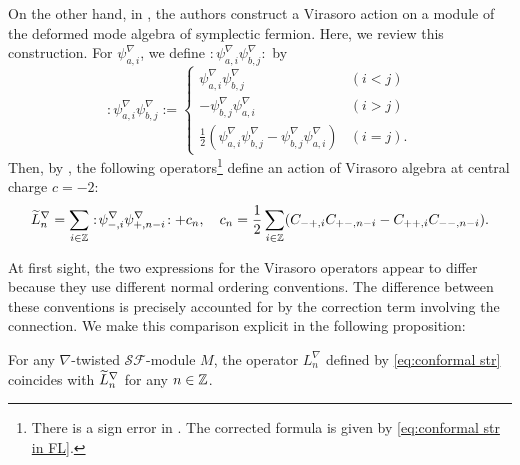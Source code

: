 \documentclass[final,reqno]{amsart}
\begin{document}
On the other hand, in \cite[\S 4]{FL25}, the authors construct a Virasoro action on a module of the deformed mode algebra of symplectic fermion. Here, we review this construction. For $\psi^\nabla_{a,i}$, we define $:\!\psi^\nabla_{a,i}\psi^\nabla_{b,j}\!:$ by
\[  
    :\!\psi^\nabla_{a,i}\psi^\nabla_{b,j}\!:=\left\{
    \begin{array}{cl}
        \psi^\nabla_{a,i}\psi^\nabla_{b,j} & (i<j)\\
        -\psi^\nabla_{b,j}\psi^\nabla_{a,i} & (i>j)\\
        \frac{1}{2}(\psi^\nabla_{a,i}\psi^\nabla_{b,j}-\psi^\nabla_{b,j}\psi^\nabla_{a,i}) & (i=j).
    \end{array}
    \right.
\]
Then, by \cite[Lemma~4.3]{FL25}, the following operators\footnote{There is a sign error in \cite[Lemma~4.3]{FL25}. The corrected formula is given by \cref{eq:conformal str in FL}.} define an action of Virasoro algebra at central charge $c=-2$:
\begin{equation}\label{eq:conformal str in FL}
    \widetilde{L}^\nabla_n=\sum_{i\in\mathbb{Z}}:\!\psi^\nabla_{-,i}\psi^\nabla_{+,n-i}\!:+c_n,\quad c_n=\frac{1}{2}\sum_{i\in\mathbb{Z}}(C_{-+,i}C_{+-,n-i}-C_{++,i}C_{--,n-i}).
\end{equation}

At first sight, the two expressions for the Virasoro operators appear to differ because they use different normal ordering conventions. The difference between these conventions is precisely accounted for by the correction term involving the connection. We make this comparison explicit in the following proposition:
\begin{prp}
    For any $\nabla$-twisted $\mathcal{SF}$-module $M$, the operator $L^\nabla_n$ defined by \cref{eq:conformal str} coincides with $\widetilde{L}^\nabla_n$ for any $n\in\mathbb{Z}$. 
\end{prp}
\end{document}

